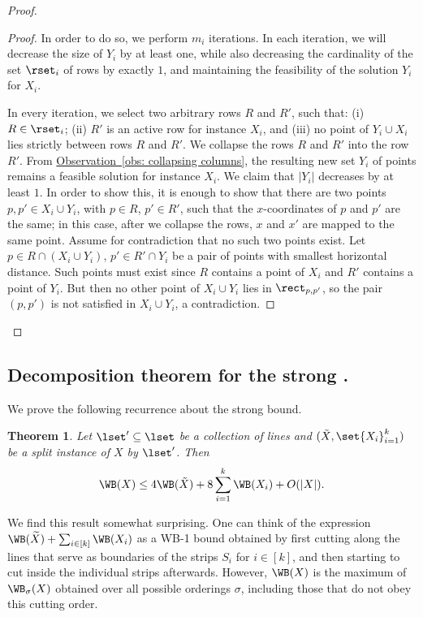 \documentclass[11pt]{article}
\numberwithin{equation}{section}
\newtheorem{theorem}{Theorem}[section]
\theoremstyle{definition}
\theoremstyle{plain}
\newcommand{\expref}[2]{\hyperref[#2]{#1~\ref{#2}}}
\begin{document}
\begin{proof}
\begin{proof}
                In order to do so, we perform $m_i$ iterations. In each iteration, we will decrease the size of $Y_i$ by at least one, while also decreasing the cardinality of the set $\rset_i$ of rows by exactly $1$, and maintaining the feasibility of the solution $Y_i$ for $X_i$.  
                
                In every iteration, we select two arbitrary rows $R$ and $R'$, such that: (i) $R\in \rset_i$; (ii) $R'$ is an active row for instance $X_i$, and (iii) no point of $Y_i\cup X_i$ lies strictly between rows $R$ and $R'$. 
                We collapse the rows $R$ and $R'$ into the row $R'$. 
From \expref{Observation}{obs: collapsing columns}, the resulting new set $Y_i$ of points remains a feasible solution for instance $X_i$. 
We claim that $|Y_i|$ decreases by at least $1$. In order to show this, it is enough to show that there are two points $p,p'\in X_i\cup Y_i$, with $p\in R$, $p'\in R'$, such that the $x$-coordinates of $p$ and $p'$ are the same; in this case, after we collapse the rows, $x$ and $x'$ are mapped to the same point. Assume for contradiction that no such two points exist. Let $p\in R\cap (X_i\cup Y_i)$, $p'\in R'\cap Y_i$ be a pair of points with smallest horizontal distance. Such points must exist since $R$ contains a point of $X_i$ and $R'$ contains a point of $Y_i$. But then no other point of  $X_i\cup Y_i$ lies in $\rect_{p,p'}$, so the pair $(p,p')$ is not satisfied in $X_i\cup Y_i$, a contradiction.
%
%
%
%
%
\end{proof}
%
\end{proof}



%
%
%
%
\subsection{Decomposition theorem for the strong \WBone.}
\label{thm: wb}
%
%
We prove the following recurrence about the strong \WBone bound. 
%
%
%


\begin{theorem}\label{thm: WB for corner and strip instances}
%
%
        Let $\lset' \subseteq \lset$ be a collection of lines and $(\tilde{X}, \set{X_i}_{i=1}^k)$ be a split instance of $X$ by $\lset'$. Then 
	$$\WB(X)\leq 4\WB(\tilde{X})+8\sum_{i=1}^k\WB(X_i)+O(|X|).   $$
\end{theorem}


We find this result somewhat surprising. 
One can think of the expression $\WB(\widetilde{X})+\sum_{i \in [k]}\WB(X_i)$ as a WB-1 bound obtained by first cutting along the lines that serve as boundaries of the strips $S_i$ for $i \in [k]$, and then starting to cut inside the individual strips afterwards. However, $\WB(X)$ is the maximum of $\WB_{\sigma}(X)$ obtained over all possible orderings $\sigma$, including those that do not obey this cutting order. %
%
\end{document}
